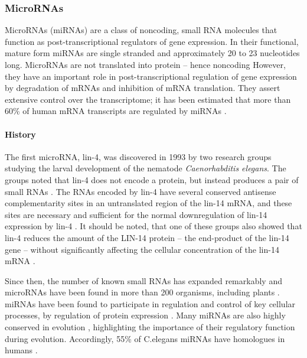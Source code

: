 \subsubsection{MicroRNAs}\label{micrornas}

MicroRNAs (miRNAs) are a class of noncoding, small RNA molecules that function
as post-transcriptional regulators of gene expression. In their functional, mature form
miRNAs are single stranded and approximately 20 to 23 nucleotides long.
MicroRNAs are not translated into protein -- hence noncoding However, they
have an important role in post-transcriptional regulation of gene expression
by degradation of mRNAs and inhibition of mRNA translation. They assert
extensive control over the transcriptome; it has been estimated that more than
60\% of human mRNA transcripts are regulated by miRNAs \citep{CITE}.


\paragraph{History}

The first microRNA, lin-4, was discovered in 1993 by two research groups
studying the larval development of the nematode \emph{Caenorhabditis elegans}.
The groups noted that lin-4 does not encode a protein, but instead produces a
pair of small RNAs \citep{Lee1993,Wightman1993}. The RNAs encoded by lin-4 have several
conserved antisense complementarity sites in an untranslated region of the
lin-14 mRNA, and these sites are necessary and sufficient for the normal
downregulation of lin-14 expression by lin-4 \citep{Lee1993,Wightman1993}. It
should be noted, that one of these groups also showed that lin-4 reduces the
amount of the LIN-14 protein -- the end-product of the lin-14 gene -- without
significantly affecting the cellular concentration of the lin-14 mRNA
\citep{??}. %

Since then, the number of known small RNAs has expanded remarkably and
microRNAs have been found in more than 200 organisms, including plants
\citep{Jones-Rhoades2006,TOINENERILAJEISTA}. miRNAs have been found to
participate in regulation and control of key cellular
processes, by regulation of protein expression \citep{Bushati2007}. Many miRNAs are
also highly conserved in evolution \citep{Bartel2004}, highlighting the
importance of their regulatory function during evolution. Accordingly, 55\% of
C.elegans miRNAs have homologues in humans \cite{Ibanez-Ventoso2008}.

